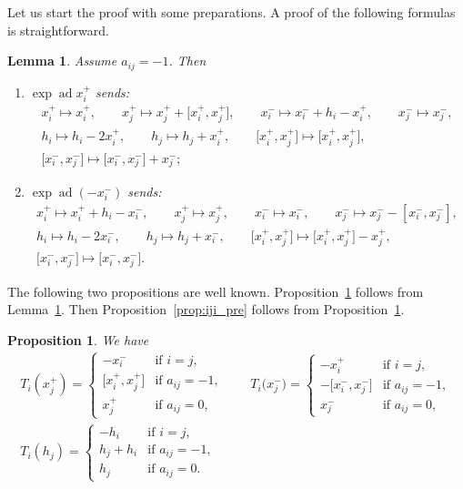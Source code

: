 \documentclass[10pt,a4paper]{amsart}
\newtheorem{prop}[thm]{Proposition}
\newtheorem{lem}[thm]{Lemma}
\theoremstyle{definition}
\numberwithin{equation}{section}
\DeclareMathOperator{\ad}{ad}
\begin{document}
Let us start the proof with some preparations. A proof of the following formulas is straightforward.
\begin{lem}\label{lem:expad1} Assume $a_{ij}=-1$. Then
\begin{enumerate}\itemsep=0pt
\item $\exp\ad x_{i}^{+}$ sends:
\begin{gather*}
x_i^+ \mapsto x_i^+, \qquad x_j^+ \mapsto x_j^+ + \big[x_i^+,x_j^+\big],\qquad x_i^- \mapsto x_i^-+h_i-x_i^+, \qquad x_j^- \mapsto x_j^-,\\
h_i \mapsto h_i-2x_i^+,\qquad h_j \mapsto h_j+x_i^+,\qquad \big[x_i^+,x_j^+\big] \mapsto \big[x_i^+,x_j^+\big],\\
 \big[x_i^-,x_j^-\big] \mapsto \big[x_i^-,x_j^-\big] + x_j^-;
\end{gather*}
\item $\exp\ad (-x_{i}^{-})$ sends:
\begin{gather*}
x_i^+ \mapsto x_i^++h_i-x_i^-, \qquad x_j^+ \mapsto x_j^+,\qquad x_i^- \mapsto x_i^-, \qquad x_j^- \mapsto x_j^--[x_i^-,x_j^-],\\
h_i \mapsto h_i-2x_i^-,\qquad h_j \mapsto h_j+x_i^-,\qquad \big[x_i^+,x_j^+\big] \mapsto \big[x_i^+,x_j^+\big]-x_j^+,\\
 \big[x_i^-,x_j^-\big] \mapsto \big[x_i^-,x_j^-\big].
\end{gather*}
\end{enumerate}
\end{lem}

The following two propositions are well known. Proposition~\ref{prop:formula1} follows from Lemma~\ref{lem:expad1}. Then Proposition~\ref{prop:iji_pre} follows from Proposition~\ref{prop:formula1}.
\begin{prop}\label{prop:formula1} We have
\begin{gather*}
T_i(x_j^+) = \begin{cases}
-x_i^- & \text{if $i=j$},\\
\big[x_i^+,x_j^+\big] & \text{if $a_{ij}=-1$},\\
x_j^+ & \text{if $a_{ij}=0$},
\end{cases}\qquad
T_i\big(x_j^-\big) = \begin{cases}
-x_i^+ & \text{if $i=j$},\\
-\big[x_i^-,x_j^-\big] & \text{if $a_{ij}=-1$},\\
x_j^- & \text{if $a_{ij}=0$},
\end{cases}
\\
T_i(h_j) = \begin{cases}
-h_i & \text{if $i=j$},\\
h_j + h_i & \text{if $a_{ij}=-1$},\\
h_j & \text{if $a_{ij}=0$}.
\end{cases}
\end{gather*}
\end{prop}
\end{document}
